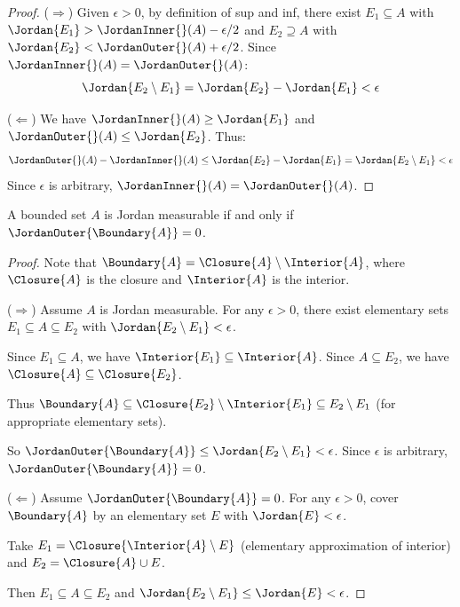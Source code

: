 \begin{proof}
($\Rightarrow$) Given $\epsilon > 0$, by definition of sup and inf, there exist $E_1 \subseteq A$ with $\Jordan{E_1} > \JordanInner{}(A) - \epsilon/2$ and $E_2 \supseteq A$ with $\Jordan{E_2} < \JordanOuter{}(A) + \epsilon/2$. Since $\JordanInner{}(A) = \JordanOuter{}(A)$:
\[ \Jordan{E_2 \setminus E_1} = \Jordan{E_2} - \Jordan{E_1} < \epsilon \]

($\Leftarrow$) We have $\JordanInner{}(A) \geq \Jordan{E_1}$ and $\JordanOuter{}(A) \leq \Jordan{E_2}$. Thus:
\[ \JordanOuter{}(A) - \JordanInner{}(A) \leq \Jordan{E_2} - \Jordan{E_1} = \Jordan{E_2 \setminus E_1} < \epsilon \]
Since $\epsilon$ is arbitrary, $\JordanInner{}(A) = \JordanOuter{}(A)$.
\end{proof}

\begin{theorem}
A bounded set $A$ is Jordan measurable if and only if $\JordanOuter{\Boundary{A}} = 0$.
\end{theorem}

\begin{proof}
Note that $\Boundary{A} = \Closure{A} \setminus \Interior{A}$, where $\Closure{A}$ is the closure and $\Interior{A}$ is the interior.

($\Rightarrow$) Assume $A$ is Jordan measurable. For any $\epsilon > 0$, there exist elementary sets $E_1 \subseteq A \subseteq E_2$ with $\Jordan{E_2 \setminus E_1} < \epsilon$.

Since $E_1 \subseteq A$, we have $\Interior{E_1} \subseteq \Interior{A}$. Since $A \subseteq E_2$, we have $\Closure{A} \subseteq \Closure{E_2}$.

Thus $\Boundary{A} \subseteq \Closure{E_2} \setminus \Interior{E_1} \subseteq E_2 \setminus E_1$ (for appropriate elementary sets).

So $\JordanOuter{\Boundary{A}} \leq \Jordan{E_2 \setminus E_1} < \epsilon$. Since $\epsilon$ is arbitrary, $\JordanOuter{\Boundary{A}} = 0$.

($\Leftarrow$) Assume $\JordanOuter{\Boundary{A}} = 0$. For any $\epsilon > 0$, cover $\Boundary{A}$ by an elementary set $E$ with $\Jordan{E} < \epsilon$.

Take $E_1 = \Closure{\Interior{A} \setminus E}$ (elementary approximation of interior) and $E_2 = \Closure{A} \cup E$.

Then $E_1 \subseteq A \subseteq E_2$ and $\Jordan{E_2 \setminus E_1} \leq \Jordan{E} < \epsilon$.
\end{proof}


